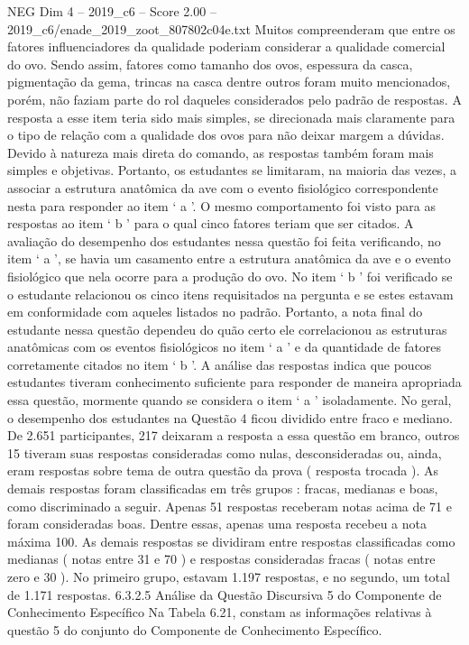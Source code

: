 \begin{textsample}{NEG Dim 4 – 2019\_c6 – Score 2.00 – 2019\_c6/enade\_2019\_zoot\_807802c04e.txt}
Muitos compreenderam que entre os fatores influenciadores da qualidade poderiam considerar a qualidade comercial do ovo.
Sendo assim, fatores como tamanho dos ovos, espessura da casca, pigmentação da gema, trincas na casca dentre outros foram muito mencionados, porém, não faziam parte do rol daqueles considerados pelo padrão de respostas.
A resposta a esse item teria sido mais simples, se direcionada mais claramente para o tipo de relação com a qualidade dos ovos para não deixar margem a dúvidas.
Devido à natureza mais direta do comando, as respostas também foram mais simples e objetivas.
Portanto, os estudantes se limitaram, na maioria das vezes, a associar a estrutura anatômica da ave com o evento fisiológico correspondente nesta para responder ao item ‘ a ’.
O mesmo comportamento foi visto para as respostas ao item ‘ b ’ para o qual cinco fatores teriam que ser citados.
A avaliação do desempenho dos estudantes nessa questão foi feita verificando, no item ‘ a ’, se havia um casamento entre a estrutura anatômica da ave e o evento fisiológico que nela ocorre para a produção do ovo.
No item ‘ b ’ foi verificado se o estudante relacionou os cinco itens requisitados na pergunta e se estes estavam em conformidade com aqueles listados no padrão.
Portanto, a nota final do estudante nessa questão dependeu do quão certo ele correlacionou as estruturas anatômicas com os eventos fisiológicos no item ‘ a ’ e da quantidade de fatores corretamente citados no item ‘ b ’.
A análise das respostas indica que poucos estudantes tiveram conhecimento suficiente para responder de maneira apropriada essa questão, mormente quando se considera o item ‘ a ’ isoladamente.
No geral, o desempenho dos estudantes na Questão 4 ficou dividido entre fraco e mediano.
De 2.651 participantes, 217 deixaram a resposta a essa questão em branco, outros 15 tiveram suas respostas consideradas como nulas, desconsideradas ou, ainda, eram respostas sobre tema de outra questão da prova ( resposta trocada ).
As demais respostas foram classificadas em três grupos : fracas, medianas e boas, como discriminado a seguir.
Apenas 51 respostas receberam notas acima de 71 e foram consideradas boas.
Dentre essas, apenas uma resposta recebeu a nota máxima 100.
As demais respostas se dividiram entre respostas classificadas como medianas ( notas entre 31 e 70 ) e respostas consideradas fracas ( notas entre zero e 30 ).
No primeiro grupo, estavam 1.197 respostas, e no segundo, um total de 1.171 respostas. 6.3.2.5 Análise da Questão Discursiva 5 do Componente de Conhecimento Específico Na Tabela 6.21, constam as informações relativas à questão 5 do conjunto do Componente de Conhecimento Específico.

\end{textsample}
